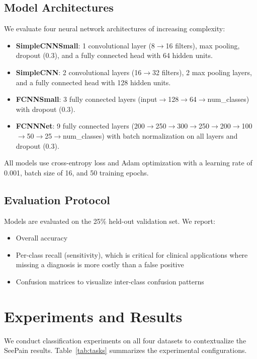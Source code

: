 \documentclass[conference]{IEEEtran}
\begin{document}
\subsection{Model Architectures}

We evaluate four neural network architectures of increasing complexity:

\begin{itemize}
    \item \textbf{SimpleCNNSmall}: 1 convolutional layer (8$\to$16 filters), max pooling, dropout (0.3), and a fully connected head with 64 hidden units.
    \item \textbf{SimpleCNN}: 2 convolutional layers (16$\to$32 filters), 2 max pooling layers, and a fully connected head with 128 hidden units.
    \item \textbf{FCNNSmall}: 3 fully connected layers (input$\to$128$\to$64$\to$num\_classes) with dropout (0.3).
    \item \textbf{FCNNNet}: 9 fully connected layers (200$\to$250$\to$300$\to$250$\to$200$\to$100$\to$50$\to$25$\to$num\_classes) with batch normalization on all layers and dropout (0.3).
\end{itemize}

All models use cross-entropy loss and Adam optimization with a learning rate of 0.001, batch size of 16, and 50 training epochs.

\subsection{Evaluation Protocol}

Models are evaluated on the 25\% held-out validation set. We report:
\begin{itemize}
    \item Overall accuracy
    \item Per-class recall (sensitivity), which is critical for clinical applications where missing a diagnosis is more costly than a false positive
    \item Confusion matrices to visualize inter-class confusion patterns
\end{itemize}

\section{Experiments and Results}
\label{sec:results}

We conduct classification experiments on all four datasets to contextualize the SeePain results. Table~\ref{tab:tasks} summarizes the experimental configurations.
\end{document}
